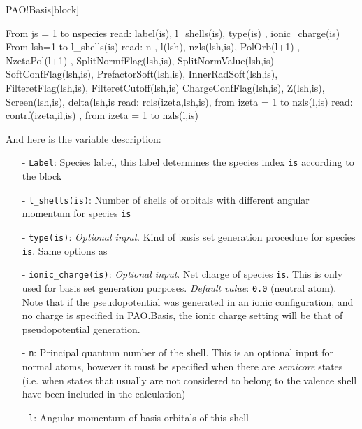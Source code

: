 \begin{fdfentry}{PAO!Basis}[block]
\begin{shellexample}
    From js = 1 to  nspecies
       read: label(is), l_shells(is), { type(is) }, { ionic_charge(is) }
       From lsh=1 to l_shells(is)
        read:
         { n }, l(lsh), nzls(lsh,is), { PolOrb(l+1) }, { NzetaPol(l+1) },
         {SplitNormfFlag(lsh,is)}, {SplitNormValue(lsh,is)}
         {SoftConfFlag(lsh,is)}, {PrefactorSoft(lsh,is)}, {InnerRadSoft(lsh,is)},
         {FilteretFlag(lsh,is)}, {FilteretCutoff(lsh,is)}
         {ChargeConfFlag(lsh,is)}, {Z(lsh,is)}, {Screen(lsh,is)}, {delta(lsh,is}
           read: rcls(izeta,lsh,is), from izeta = 1 to nzls(l,is)
           read: { contrf(izeta,il,is) }, from izeta = 1 to nzls(l,is)
\end{shellexample}

  \noindent
  And here is the variable description:
  \begin{itemize}
    \item[-] %
    \texttt{Label}: Species label, this label determines
    the species index \texttt{is} according to the block

    \item[-]%
    \texttt{l\_shells(is)}: Number of shells of orbitals
    with different angular momentum for species \texttt{is}

    \item[-]%
    \texttt{type(is)}: \textit{Optional input}.  Kind of basis set
    generation procedure for species \texttt{is}.  Same options as

    \item[-]%
    \texttt{ionic\_charge(is)}: \textit{Optional input}.  Net charge
    of species \texttt{is}. This is only used for basis set generation
    purposes. \textit{Default value}: \texttt{0.0} (neutral
    atom). Note that if the pseudopotential was generated in an ionic
    configuration, and no charge is specified in PAO.Basis, the ionic
    charge setting will be that of pseudopotential generation.

    \item[-]%
    \texttt{n}: Principal quantum number of the shell. This is an
    optional input for normal atoms, however it must be specified when
    there are \textit{semicore} states (i.e. when states that usually
    are not considered to belong to the valence shell have been
    included in the calculation)

    \item[-]%
    \texttt{l}: Angular momentum of basis orbitals of this shell


\end{itemize}
\end{fdfentry}

